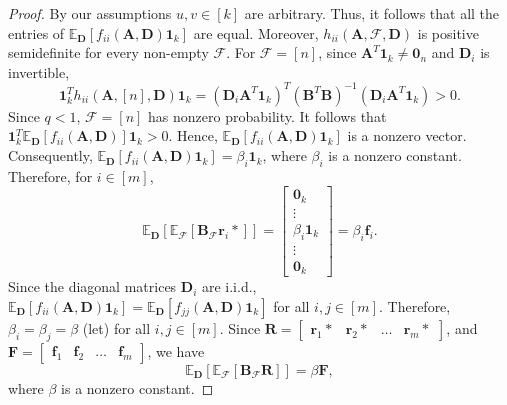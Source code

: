 \documentclass[journal,draftcls,onecolumn]{IEEEtran}
\theoremstyle{mystyle}
\newcommand{\bfD}{\mathbf{D}}
\newcommand{\bfF}{\mathbf{F}}
\newcommand{\bfA}{\mathbf{A}}
\newcommand{\bfR}{\mathbf{R}}
\newcommand{\cF}{\mathcal{F}}
\begin{document}
\begin{proof}
By our assumptions $u,v \in [k]$ are arbitrary. Thus, it follows that all the entries of $\mathbb{E}_{\mathbf{D}} [f_{ii}( \mathbf{A}, \mathbf{D}) \mathbf{1}_k ]$ are equal. Moreover, $h_{ii}(\bfA, \cF, \bfD)$ is positive semidefinite for every non-empty $\cF$. For $\mathcal F=[n]$, since $\mathbf{A}^T\mathbf{1}_k \ne \mathbf{0}_n$ and $\mathbf D_i$ is invertible,
\[
\mathbf 1_k^T h_{ii}(\mathbf A,[n],\mathbf D)\mathbf 1_k
=
(\mathbf D_i\mathbf A^T\mathbf 1_k)^T
(\mathbf B^T\mathbf B)^{-1}
(\mathbf D_i\mathbf A^T\mathbf 1_k)>0.
\]
Since $q < 1$, $\cF = [n]$ has nonzero probability. It follows that
$
\mathbf 1_k^T\mathbb{E}_{\mathbf D}
[f_{ii}(\mathbf A,\mathbf D)]\mathbf 1_k>0
$.
Hence, $\mathbb{E}_{\mathbf D}[f_{ii}(\mathbf A,\mathbf D)\mathbf 1_k]$
is a nonzero vector. Consequently,
$
\mathbb{E}_{\mathbf D}[f_{ii}(\mathbf A,\mathbf D)\mathbf 1_k]
=\beta_i\mathbf 1_k
$, where $\beta_i$ is a nonzero constant.  
Therefore, for $i \in [m]$,
\[\mathbb{E}_{\mathbf{D}} [\mathbb{E}_{\mathcal{F}}[ \mathbf{B}_{\mathcal{F}} \mathbf{r}_i*] ] = \begin{bmatrix}\mathbf{0}_k \\ \vdots \\ \beta_i\mathbf{1}_k\\ \vdots \\ \mathbf{0}_k \end{bmatrix} = \beta_i\mathbf{f}_i.\]
Since the diagonal matrices $\mathbf{D}_i$ are i.i.d., $\mathbb{E}_{\mathbf{D}}[ {f}_{ii}(\bfA,\bfD) \mathbf{1}_{k}] = \mathbb{E}_{\mathbf{D}}[{f}_{jj}(\bfA,\bfD) \mathbf{1}_{k}]$ for all $i,j \in [m]$. Therefore, $\beta_i = \beta_ j = \beta$ (let) for all $i ,j \in [m]$.
Since $\bfR = \begin{bmatrix}\mathbf{r}_1* & \mathbf{r}_2* & \dots & \mathbf{r}_m* \end{bmatrix}$, and $\bfF = \begin{bmatrix}\mathbf{f}_1 & \mathbf{f}_2 & \dots & \mathbf{f}_m \end{bmatrix}$, we have  \[\mathbb{E}_{\mathbf{D}} [\mathbb{E}_{\mathcal{F}}[ \mathbf{B}_{\mathcal{F}} \mathbf{R}] ] = \beta\mathbf{F},\]
where $\beta$ is a nonzero constant.
\end{proof}
\end{document}
